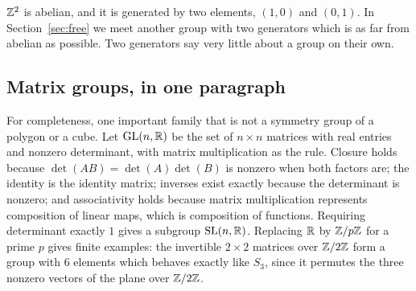 
\begin{pitfall}
$\mathbb{Z}^2$ is abelian, and it is generated by two elements, $(1,0)$ and $(0,1)$. In
Section~\ref{sec:free} we meet another group with two generators which is as far from abelian as
possible. Two generators say very little about a group on their own.
\end{pitfall}

\subsection{Matrix groups, in one paragraph}\label{sec:matrix}

For completeness, one important family that is not a symmetry group of a polygon or a cube.
Let $\mathrm{GL}(n,\mathbb{R})$ be the set of $n\times n$ matrices with real entries and nonzero determinant, with
matrix multiplication as the rule. Closure holds because $\det(AB)=\det(A)\det(B)$ is nonzero when
both factors are; the identity is the identity matrix; inverses exist exactly because the
determinant is nonzero; and associativity holds because matrix multiplication represents
composition of linear maps, which is composition of functions. Requiring determinant exactly $1$
gives a subgroup $\mathrm{SL}(n,\mathbb{R})$. Replacing $\mathbb{R}$ by $\mathbb{Z}/p\mathbb{Z}$ for a prime $p$ gives finite examples: the
invertible $2\times2$ matrices over $\mathbb{Z}/2\mathbb{Z}$ form a group with $6$ elements which behaves exactly
like $S_3$, since it permutes the three nonzero vectors of the plane over $\mathbb{Z}/2\mathbb{Z}$.
